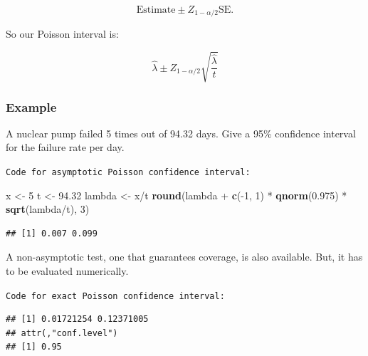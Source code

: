 \documentclass[]{article}
\newenvironment{Shaded}{\begin{snugshade}}{\end{snugshade}}
\newcommand{\KeywordTok}[1]{\textcolor[rgb]{0.13,0.29,0.53}{\textbf{{#1}}}}
\newcommand{\DataTypeTok}[1]{\textcolor[rgb]{0.13,0.29,0.53}{{#1}}}
\newcommand{\DecValTok}[1]{\textcolor[rgb]{0.00,0.00,0.81}{{#1}}}
\newcommand{\FloatTok}[1]{\textcolor[rgb]{0.00,0.00,0.81}{{#1}}}
\newcommand{\StringTok}[1]{\textcolor[rgb]{0.31,0.60,0.02}{{#1}}}
\newcommand{\NormalTok}[1]{{#1}}
\begin{document}
\[
\mbox{Estimate} \pm Z_{1-\alpha/2} \mbox{SE}.
\]

So our Poisson interval is:

\[
\hat \lambda \pm  Z_{1-\alpha/2} \sqrt{\frac{\hat \lambda}{t}}
\]

\subsubsection{Example}\label{example-16}

A nuclear pump failed 5 times out of 94.32 days. Give a 95\% confidence
interval for the failure rate per day.

\vspace{1pc}

\verb;Code for asymptotic Poisson confidence interval:;

\begin{Shaded}
\begin{Highlighting}[]
\NormalTok{x <-}\StringTok{ }\DecValTok{5}
\NormalTok{t <-}\StringTok{ }\FloatTok{94.32}
\NormalTok{lambda <-}\StringTok{ }\NormalTok{x/t}
\KeywordTok{round}\NormalTok{(lambda +}\StringTok{ }\KeywordTok{c}\NormalTok{(-}\DecValTok{1}\NormalTok{, }\DecValTok{1}\NormalTok{) *}\StringTok{ }\KeywordTok{qnorm}\NormalTok{(}\FloatTok{0.975}\NormalTok{) *}\StringTok{ }\KeywordTok{sqrt}\NormalTok{(lambda/t), }\DecValTok{3}\NormalTok{)}
\end{Highlighting}
\end{Shaded}

\begin{verbatim}
## [1] 0.007 0.099
\end{verbatim}

A non-asymptotic test, one that guarantees coverage, is also available.
But, it has to be evaluated numerically.

\vspace{1pc}

\verb;Code for exact Poisson confidence interval:;

\begin{Shaded}
\end{Shaded}

\begin{verbatim}
## [1] 0.01721254 0.12371005
## attr(,"conf.level")
## [1] 0.95
\end{verbatim}
\end{document}
